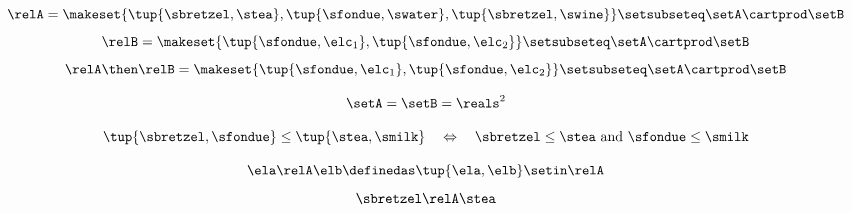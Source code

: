 {\begin{forslides}
        \begin{equation}
            \relA = \makeset{ \tup{\sbretzel, \stea}, \tup{\sfondue, \swater}, \tup{\sbretzel, \swine} } \setsubseteq \setA \cartprod \setB \label{eq:slides-7}
        \end{equation}
        \begin{equation}
            \relB = \makeset{ \tup{\sfondue, \elc_1}, \tup{\sfondue, \elc_2} } \setsubseteq \setA \cartprod \setB \label{eq:slides-8}
        \end{equation}
        \begin{equation}
            \relA \then \relB = \makeset{ \tup{\sfondue, \elc_1}, \tup{\sfondue, \elc_2} } \setsubseteq \setA \cartprod \setB \label{eq:slides-9}
        \end{equation}

        \begin{equation}
            \setA = \setB = \reals^2 \label{eq:slides-12}
        \end{equation}


        \begin{equation}
            \tup{\sbretzel, \sfondue} \leq \tup{\stea, \smilk} \quad \Leftrightarrow \quad \sbretzel \leq \stea \text{ and } \sfondue \leq \smilk \label{eq:slides-14}
        \end{equation}

        \begin{equation}
            \ela \relA \elb \definedas \tup{\ela, \elb} \setin \relA  \label{eq:slides-15}
        \end{equation}
        \begin{equation}
            \sbretzel \relA \stea \label{eq:slides-16}
        \end{equation}


\end{forslides}}
